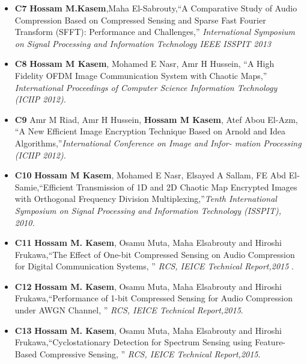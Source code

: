 \documentclass[10pt]{article}
\newenvironment{innerlist}[1][\enskip\textbullet]%
        {\begin{itemize}[#1,leftmargin=*,parsep=0pt,itemsep=0pt,topsep=0pt,partopsep=0pt]}
        {\end{itemize}}
\begin{document}
\begin{innerlist}
\item[\textbf{C7}] {\bf Hossam M.Kasem},Maha El-Sabrouty,\textquotedblleft  A Comparative Study of Audio Compression Based on Compressed Sensing and Sparse Fast Fourier Transform (SFFT): Performance and Challenges,\textquotedblright \emph { 
International Symposium on Signal Processing and Information Technology IEEE ISSPIT 2013}  \\
 
 
 
\item[\textbf{C8}]  {\bf Hossam M Kasem}, Mohamed E Nasr, Amr H Hussein, \textquotedblleft A High Fidelity OFDM Image Communication System with Chaotic Maps,\textquotedblright \emph {
International Proceedings of Computer Science  Information Technology (ICIIP 2012).}\\


 \item[\textbf{C9}] Amr M Riad, Amr H Hussein, {\bf Hossam M Kasem}, Atef Abou El-Azm, \textquotedblleft A New Efficient Image Encryption Technique Based on Arnold and Idea Algorithms,\textquotedblright \emph {International Conference on Image and Infor-
mation Processing (ICIIP 2012).} \\
  
\item[\textbf{C10}] {\bf Hossam M Kasem}, Mohamed E Nasr, Elsayed A Sallam, FE Abd El-Samie,\textquotedblleft Efficient Transmission of 1D and 2D Chaotic Map Encrypted Images with Orthogonal Frequency Division Multiplexing,\textquotedblright \emph {Tenth International Symposium on Signal Processing and Information Technology (ISSPIT), 2010.}\\






\item[\textbf{C11}] {\bf Hossam M. Kasem}, Osamu Muta, Maha Elsabrouty and Hiroshi Frukawa,\textquotedblleft The Effect of One-bit Compressed Sensing on Audio Compression for Digital Communication Systems, 
 \textquotedblright \emph{ RCS, IEICE Technical Report,2015 }.\\ 

\item[\textbf{C12}]  {\bf Hossam M. Kasem}, Osamu Muta, Maha Elsabrouty and Hiroshi Frukawa,\textquotedblleft Performance of 1-bit Compressed Sensing for Audio Compression under AWGN Channel, \textquotedblright \emph{ RCS, IEICE Technical Report,2015}.\\ 

\item[\textbf{C13}]  {\bf Hossam M. Kasem}, Osamu Muta, Maha Elsabrouty and Hiroshi Frukawa,\textquotedblleft Cyclostationary Detection for Spectrum Sensing using Feature-Based Compressive Sensing, \textquotedblright \emph{ RCS, IEICE Technical Report,2015}.

\end{innerlist}
\end{document}
